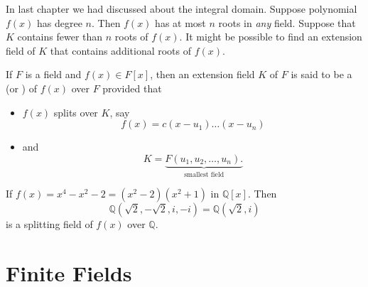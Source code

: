 In last chapter we had discussed about the integral domain. Suppose 
polynomial $f(x)$ has degree $n$. Then $f(x)$ has at most $n$ roots in \textit{any} field. 
Suppose that $K$ contains fewer than $n$ roots of $f(x)$. It might be possible to find an extension field of 
$K$ that contains additional roots of $f(x)$. 

\begin{definition}
    If $F$ is a field and $f(x) \in F[x]$, then an extension field $K$ of $F$ is said to 
    be a  (or ) of $f(x)$ over $F$ provided that 
    \begin{itemize}
        \item $f(x)$ splits over $K$, say 
        \begin{equation}
            f(x) = c(x-u_1)\ldots (x-u_n)
        \end{equation}
        \item and
        \begin{equation}
            K = \underbrace{F(u_1, u_2, \ldots, u_n).}_{\text{smallest field}}
        \end{equation}
    \end{itemize}
\end{definition}

\begin{example}
    If $f(x) = x^4 - x^2 - 2 = (x^2 - 2)(x^2 + 1)$ in $\mathbb{Q}[x]$. Then 
    \[
        \mathbb{Q}(\sqrt{2}, -\sqrt{2}, i, -i) = \mathbb{Q}(\sqrt{2}, i)
    \]
    is a splitting field of $f(x)$ over $\mathbb{Q}$.
\end{example}


\section{Finite Fields}

